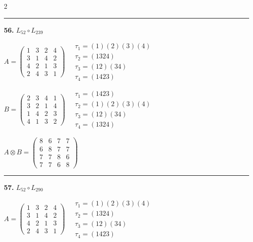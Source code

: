 \begin{multicols}{2}
\vspace{0.3em}
\hrule
\vspace{0.3em}

\noindent\textbf{56.} $L_{52} \circ L_{239}$

$A = \begin{pmatrix} 1 & 3 & 2 & 4 \\ 3 & 1 & 4 & 2 \\ 4 & 2 & 1 & 3 \\ 2 & 4 & 3 & 1 \end{pmatrix} \quad \begin{matrix} \tau_{1}=(1)(2)(3)(4) \\ \tau_{2}=(1 3 2 4) \\ \tau_{3}=(1 2)(3 4) \\ \tau_{4}=(1 4 2 3) \end{matrix}$

$B = \begin{pmatrix} 2 & 3 & 4 & 1 \\ 3 & 2 & 1 & 4 \\ 1 & 4 & 2 & 3 \\ 4 & 1 & 3 & 2 \end{pmatrix} \quad \begin{matrix} \tau_{1}=(1 4 2 3) \\ \tau_{2}=(1)(2)(3)(4) \\ \tau_{3}=(1 2)(3 4) \\ \tau_{4}=(1 3 2 4) \end{matrix}$

$A \otimes B = \begin{pmatrix} 8 & 6 & 7 & 7 \\ 6 & 8 & 7 & 7 \\ 7 & 7 & 8 & 6 \\ 7 & 7 & 6 & 8 \end{pmatrix}$

\vspace{0.3em}
\hrule
\vspace{0.3em}

\noindent\textbf{57.} $L_{52} \circ L_{290}$

$A = \begin{pmatrix} 1 & 3 & 2 & 4 \\ 3 & 1 & 4 & 2 \\ 4 & 2 & 1 & 3 \\ 2 & 4 & 3 & 1 \end{pmatrix} \quad \begin{matrix} \tau_{1}=(1)(2)(3)(4) \\ \tau_{2}=(1 3 2 4) \\ \tau_{3}=(1 2)(3 4) \\ \tau_{4}=(1 4 2 3) \end{matrix}$


\end{multicols}
